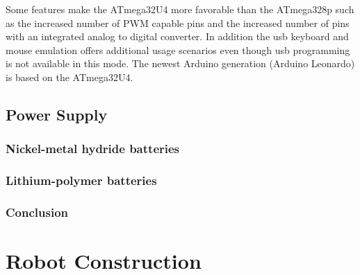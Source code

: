\documentclass[11pt,a4paper]{article}
\begin{document}
Some features make the ATmega32U4 more favorable than the ATmega328p such as the increased number of PWM capable pins and the increased number of pins with an integrated analog to digital converter. In addition the usb keyboard and mouse emulation offers additional usage scenarios even though usb programming is not available in this mode. The newest Arduino generation (Arduino Leonardo) is based on the ATmega32U4.
\subsection{Power Supply}


\subsubsection{Nickel-metal hydride batteries}
\subsubsection{Lithium-polymer batteries}

\subsubsection{Conclusion}
\section{Robot Construction}



\nocite{*}
\printbibliography
{}
\end{document}
